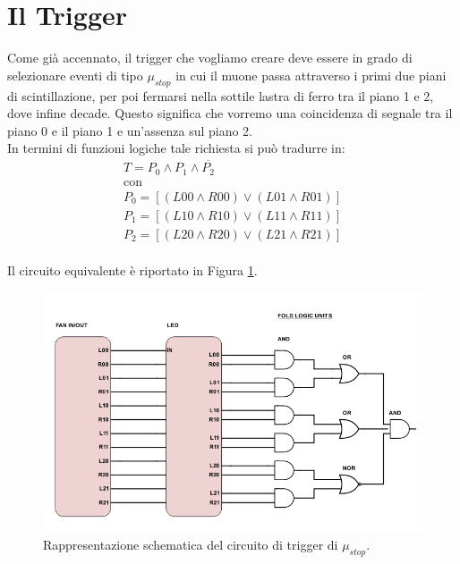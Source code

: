 \documentclass{standalone}
\begin{document}
\section{Il Trigger}
\label{sec:trigger}
Come gi\`a accennato, il trigger che vogliamo creare deve essere in grado di selezionare eventi di tipo $\mu_{stop}$ in cui il muone passa attraverso i primi due piani di scintillazione, per poi fermarsi nella sottile lastra di ferro tra il piano 1 e 2, dove infine decade. Questo significa che vorremo una coincidenza di segnale tra il piano 0 e il piano 1 e un'assenza sul piano 2.\\
 In termini di funzioni logiche tale richiesta si pu\`o tradurre in:
\begin{equation}
\begin{split}
T=P_0 \land P_1 \land \overline{P_2}
\\
\text{con}\\
P_0=[(L00\land R00)\lor (L01\land R01)]\\
P_1=[(L10\land R10)\lor (L11\land R11)]\\
P_2=[(L20\land R20)\lor (L21\land R21)]
\end{split}
\end{equation}
\\
Il circuito equivalente \`e riportato in Figura \ref{fig:circ-trigger}.

\begin{figure}[H]
	\begin{center}
		\includegraphics[width=1\textwidth]{./SCHEMI/TriggerMu.png} %
    \caption{\small Rappresentazione schematica del circuito di trigger di $\mu_{stop}$.}
		\label{fig:circ-trigger}
	\end{center}
\end{figure}
\end{document}
